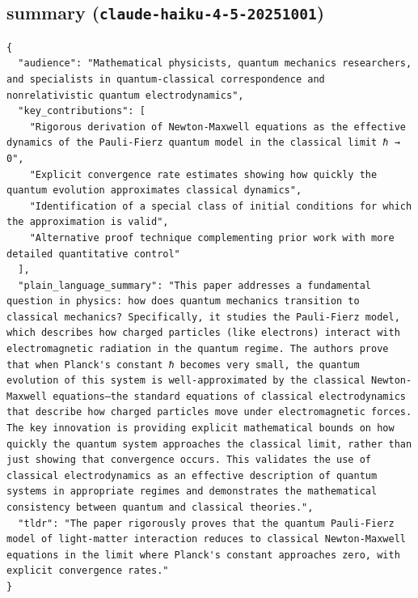 \documentclass[11pt]{article}
\begin{document}
\subsection*{summary (\texttt{claude-haiku-4-5-20251001})}
\begin{verbatim}
{
  "audience": "Mathematical physicists, quantum mechanics researchers, and specialists in quantum-classical correspondence and nonrelativistic quantum electrodynamics",
  "key_contributions": [
    "Rigorous derivation of Newton-Maxwell equations as the effective dynamics of the Pauli-Fierz quantum model in the classical limit ℏ → 0",
    "Explicit convergence rate estimates showing how quickly the quantum evolution approximates classical dynamics",
    "Identification of a special class of initial conditions for which the approximation is valid",
    "Alternative proof technique complementing prior work with more detailed quantitative control"
  ],
  "plain_language_summary": "This paper addresses a fundamental question in physics: how does quantum mechanics transition to classical mechanics? Specifically, it studies the Pauli-Fierz model, which describes how charged particles (like electrons) interact with electromagnetic radiation in the quantum regime. The authors prove that when Planck's constant ℏ becomes very small, the quantum evolution of this system is well-approximated by the classical Newton-Maxwell equations—the standard equations of classical electrodynamics that describe how charged particles move under electromagnetic forces. The key innovation is providing explicit mathematical bounds on how quickly the quantum system approaches the classical limit, rather than just showing that convergence occurs. This validates the use of classical electrodynamics as an effective description of quantum systems in appropriate regimes and demonstrates the mathematical consistency between quantum and classical theories.",
  "tldr": "The paper rigorously proves that the quantum Pauli-Fierz model of light-matter interaction reduces to classical Newton-Maxwell equations in the limit where Planck's constant approaches zero, with explicit convergence rates."
}
\end{verbatim}
\end{document}

